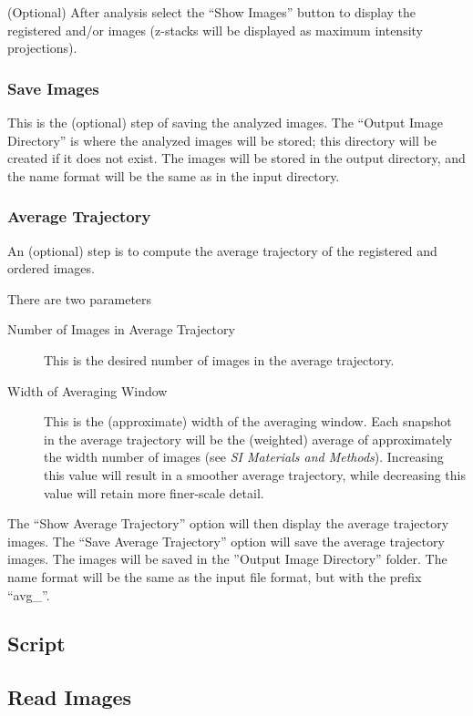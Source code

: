 \documentclass[12pt]{article}
\newcommand{\SI}[0]{\textit{SI Materials and Methods}}
\begin{document}
(Optional) After analysis select the ``Show Images'' button to display the registered and/or images (z-stacks will be displayed as maximum intensity projections). 


\subsubsection{Save Images}

This is the (optional) step of saving the analyzed images.
%
The ``Output Image Directory'' is where the analyzed images will be stored; this directory will be created if it does not exist. 
%
The images will be stored in the output directory, and the name format will be the same as in the input directory. 

\subsubsection{Average Trajectory}

An (optional) step is to compute the average trajectory of the registered and ordered images.

There are two parameters
\begin{description}
\item[Number of Images in Average Trajectory] This is the desired number of images in the average trajectory. 
%
\item[Width of Averaging Window] This is the (approximate) width of the averaging window. Each snapshot in the average trajectory will be the (weighted) average of approximately the width number of images (see \SI). Increasing this value will result in a smoother average trajectory, while decreasing this value will retain more finer-scale detail. 
% 
\end{description}

The ``Show Average Trajectory'' option will then display the average trajectory images. 
%
The ``Save Average Trajectory'' option will save the average trajectory images. 
%
The images will be saved in the ''Output Image Directory'' folder. 
%
The name format will be the same as the input file format, but with the prefix ``avg\_''.

\subsection{Script}

\subsection*{Read Images}
\end{document}
